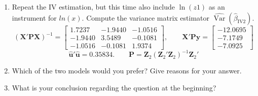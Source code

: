 \documentclass[captions=tableheading, 12pt, headings=small, parskip=half]{scrartcl}
\begin{document}
\begin{enumerate}[label = \alph*)]
	\item Repeat the IV estimation, but this time also include $\ln(z1)$ as an instrument for $ln(x)$. Compute the variance matrix estimator $\widehat{\operatorname{Var}}\left(\hat{\beta}_{\text{IV}2}\right)$.
	\[
	(\mathbf{X}'\mathbf{P}\mathbf{X})^{-1}=%
	\begin{bmatrix}
	1.7237 & -1.9440 & -1.0516 \\ 
	-1.9440 & 3.5489 & -0.1081 \\ 
	-1.0516 & -0.1081 & 1.9374%
	\end{bmatrix}%
	,\qquad \mathbf{X}'\mathbf{P}\mathbf{y}=%
	\begin{bmatrix}
	-12.0695 \\ 
	-7.1749 \\ 
	-7.0925%
	\end{bmatrix}%
	\]\[
	\widehat{\mathbf{u}}'\widehat{\mathbf{u}}=0.35834.
	\qquad \mathbf{P} = \mathbf{Z}_2(\mathbf{Z}_2'\mathbf{Z}_2)^{-1}\mathbf{Z}_2'
	\]
	\item Which of the two models would you prefer? Give reasons for your answer.
	\item What is your conclusion regarding the question at the beginning?
\end{enumerate}


\end{document}
